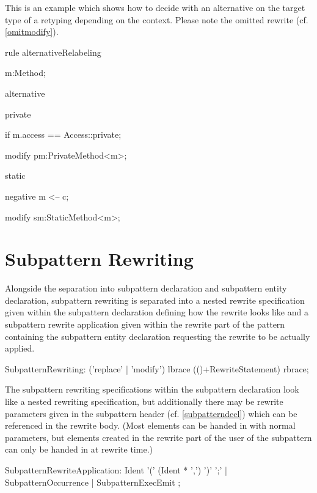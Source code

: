 \begin{example}
This is an example which shows how to decide with an alternative on the target type of a retyping depending on the context.
Please note the omitted rewrite (cf. \ref{omitmodify}).

  \begin{grgen}
rule alternativeRelabeling
{
  m:Method;
  
  alternative {
    private {
      if { m.access == Access::private; }

      modify {
        pm:PrivateMethod<m>;
      }
    }
    static {
      negative {
        m <-- c;
      }

      modify {
        sm:StaticMethod<m>;
      }
    }
  } 
}
  \end{grgen}
\end{example}


\section{Subpattern Rewriting}
\label{sec:subrule}

Alongside the separation into subpattern declaration and subpattern entity declaration, 
subpattern rewriting is separated into a nested rewrite specification given within the subpattern declaration defining how the rewrite looks like 
and a subpattern rewrite application given within the rewrite part of the pattern containing the subpattern entity declaration requesting the rewrite to be actually applied.

\pagebreak

\begin{rail}  
  SubpatternRewriting: ('replace' | 'modify') lbrace (()+RewriteStatement) rbrace;
\end{rail}

The subpattern rewriting specifications within the subpattern declaration look like a nested rewriting specification,
but additionally there may be rewrite parameters given in the subpattern header (cf. \ref{subpatterndecl}) which can be referenced in the rewrite body.
(Most elements can be handed in with normal parameters, but elements created in the rewrite part of the user of the subpattern can only be handed in at rewrite time.) 

\begin{rail}  
  SubpatternRewriteApplication: 
    Ident '(' (Ident * ',') ')' ';' |
    SubpatternOccurrence |
    SubpatternExecEmit
	;
\end{rail}

